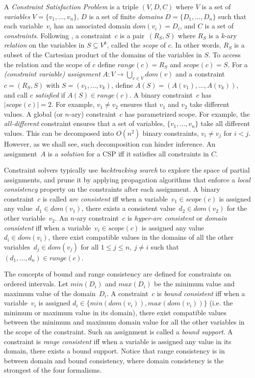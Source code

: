 \documentclass{tlp}
\newcommand{\cassignment}{A}
\newcommand{\domain}[1]{dom(#1)}
\newcommand{\range}[1]{range(#1)}
\newcommand{\scope}[1]{scope(#1)}
\begin{document}
A \emph{Constraint Satisfaction Problem} is a triple $(V,D,C)$ where $V$ is a set of \emph{variables} $V = \{v_1, \dots , v_n\}$, $D$ is a set of finite \emph{domains} $D=\{D_1, \dots , D_n\}$ such that each variable~$v_i$ has an associated domain $\domain{v_i} = D_i$, and $C$ is a set of \emph{constraints}. Following ,
a constraint~$c$ is a pair~$(R_S,S)$ where $R_S$ is a $k$-ary \emph{relation} on the variables in $S \subseteq V^k$, called the \emph{scope} of $c$. In other words, $R_S$ is a subset of the Cartesian product of the domains of the variables in $S$. To access the relation and the scope of $c$ define $\range{c} = R_S$ and $\scope{c} = S$. For a \emph{(constraint variable) assignment} $\cassignment : V \to \bigcup_{v \in V} dom(v)$ and a constraint $c = (R_S, S)$ with $S = (v_1, \dots, v_k)$, define $\cassignment(S) = (\cassignment(v_1), \dots, \cassignment(v_k))$, and call $c$ \emph{satisfied} if $\cassignment(S) \in \range{c}$. A binary constraint~$c$ has $|scope(c)|=2$. For example,
$v_1 \neq v_2$ ensures that $v_1$ and $v_2$ take different
values. A global (or $n$-ary) constraint~$c$ has parametrized
scope. For example, 
the \emph{all-different} constraint ensures that
a set of variables, $\{v_1,\ldots,v_n\}$ take all different values. 
This can be decomposed into $O(n^2)$ binary
constraints, $v_i \neq v_j$ for $i<j$. However, as 
we shall see, such decomposition can hinder inference. 
An assignment~$\cassignment$ is a \emph{solution} for a CSP iff it satisfies all constraints in $C$.

Constraint solvers typically use \emph{backtracking search} to explore the space of partial assignments, and prune it by applying propagation algorithms that enforce a \emph{local consistency}
property on the constraints after each assignment.
A binary constraint~$c$ is called \emph{arc consistent} iff when a variable~$v_1 \in \scope{c}$ is assigned any value~$d_1 \in \domain{v_1}$, there exists a consistent value~$d_2 \in \domain{v_2}$ for the other variable~$v_2$.
An $n$-ary constraint~$c$ is \emph{hyper-arc consistent} or \emph{domain consistent} iff when a variable~$v_i \in \scope{c}$ is assigned any value~$d_i \in \domain{v_i}$, there exist compatible values in the domains of all the other variables~$d_j \in \domain{v_j}$ for all $1 \leq j \leq n,\ j \neq i$ such that $(d_1, \dots, d_n) \in \range{c}$.

The concepts of bound and range consistency are defined for constraints on ordered intervals.
Let $min(D_i)$ and $max(D_i)$ be the minimum value and maximum value of the domain~$D_i$. A constraint~$c$ is \emph{bound consistent} iff when a variable~$v_i$ is assigned $d_i \in \{min(\domain{v_i}), max(\domain{v_i})\}$ (i.e. the minimum or maximum value in its domain), there exist compatible values between the minimum and maximum domain value for all the other variables in the scope of the constraint. Such an assignment is called a \emph{bound support}. A constraint is \emph{range consistent} iff when a variable is assigned any value in its domain, there exists a bound support. Notice that range consistency is in between domain and bound consistency, where domain consistency is the strongest of the four formalisms.
\end{document}
